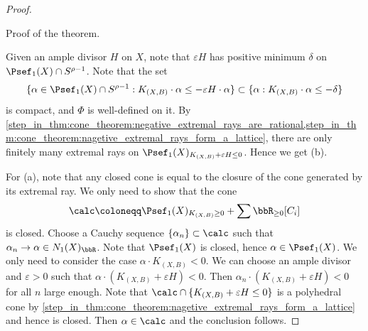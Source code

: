 \begin{proof}


        \begin{step}\label{step_in_thm:cone_theorem:finish_the_proof}
            Proof of the theorem.
        \end{step}
        Given an ample divisor \(H\) on \(X\), note that \(\varepsilon H\) has positive minimum \(\delta\) on \(\Psef_1(X) \cap S^{\rho-1}\).
        Note that the set
        \[ \{\alpha \in \Psef_1(X)\cap S^{\rho-1} : K_{(X,B)}\cdot \alpha \leq -\varepsilon H\cdot \alpha\} \subset \{\alpha: K_{(X,B)}\cdot \alpha \leq -\delta\} \]
        is compact, and \(\Phi\) is well-defined on it.
        By \cref{step_in_thm:cone_theorem:negative_extremal_rays_are_rational,step_in_thm:cone_theorem:nagetive_extremal_rays_form_a_lattice},
        there are only finitely many extremal rays on \(\Psef_1(X)_{K_{(X,B)}+\varepsilon H \leq 0}\).
        Hence we get (b).

        For (a), note that any closed cone is equal to the closure of the cone generated by its extremal ray.
        We only need to show that the cone
        \[ \calc\coloneqq \Psef_1(X)_{K_{(X,B)} \geq 0} + \sum \bbR_{\geq 0}[C_i] \]
        is closed.
        Choose a Cauchy sequence \(\{\alpha_n\} \subset \calc\) such that \(\alpha_n \to \alpha \in N_1(X)_\bbR\).
        Note that \(\Psef_1(X)\) is closed, hence \(\alpha \in \Psef_1(X)\).
        We only need to consider the case \(\alpha \cdot K_{(X,B)} < 0\).
        We can choose an ample divisor and \(\varepsilon > 0\) such that \(\alpha \cdot (K_{(X,B)}+\varepsilon H) < 0\).
        Then \(\alpha_n \cdot (K_{(X,B)}+\varepsilon H) < 0\) for all \(n\) large enough.
        Note that \(\calc \cap \{K_{(X,B)}+\varepsilon H \leq 0\}\) is a polyhedral cone by \cref{step_in_thm:cone_theorem:nagetive_extremal_rays_form_a_lattice} and hence is closed.
        Then \(\alpha \in \calc\) and the conclusion follows.
    \end{proof}
